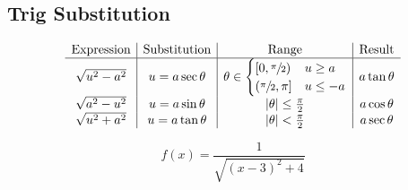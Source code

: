 	\subsection{Trig Substitution}
		\begin{theorem}
			\begin{gather*} \begin{array}{c|c|c|c}
				\text{Expression}&\text{Substitution}&\text{Range}&\text{Result}\\\hline
				\sqrt{u^2-a^2}&u=a\sec\theta&\theta\in\begin{cases}
					[0,\sfrac\pi2)&u\ge a\\
					(\sfrac\pi2,\pi]&u\le-a
				\end{cases}&a\tan\theta\\
				\sqrt{a^2-u^2}&u=a\sin\theta&|\theta|\le\frac\pi2&a\cos\theta\\
				\sqrt{u^2+a^2}&u=a\tan\theta&|\theta|<\frac\pi2&a\sec\theta\\
			\end{array} \end{gather*}
		\end{theorem}
		\begin{example}[Complete the square $\displaystyle\int\frac{dx}{\sqrt{x^2-6x+13}}=\int f(x)\,dx$]
			$$f(x)=\frac1{\sqrt{(x-3)^2+4}}$$
		\end{example}


